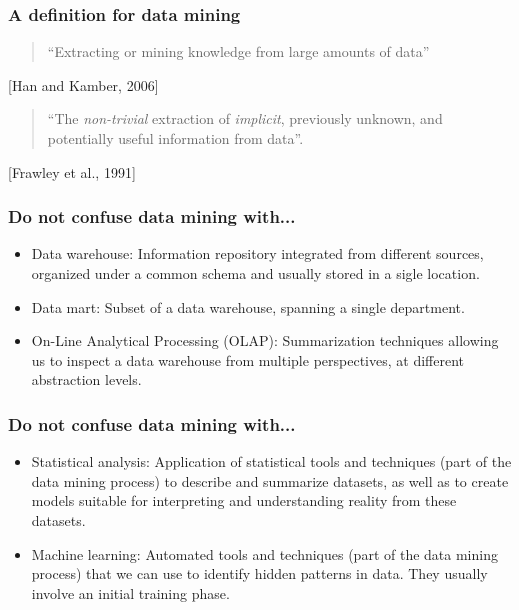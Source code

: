 \begin{frame}
\frametitle{A definition for data mining}

\begin{quote}
 ``Extracting or mining knowledge from large amounts of data''
\end{quote}
\begin{flushright}
{\small [Han and Kamber, 2006]}
\end{flushright}

\begin{quote}
 ``The \textit{non-trivial }extraction of \textit{implicit}, previously unknown, and potentially
useful information from data''.
\end{quote}
\begin{flushright}
{\small [Frawley et al., 1991]}
\end{flushright}


\end{frame}


\begin{frame}
\frametitle{Do not confuse data mining with...}

\begin{itemize}
 \item Data warehouse: Information repository integrated from different
sources, organized under a common schema and usually stored in a sigle location.

 \item Data mart: Subset of a data warehouse, spanning a single department.

 \item On-Line Analytical Processing (OLAP): Summarization techniques allowing us
to inspect a data warehouse from multiple perspectives, at different abstraction levels.

\end{itemize}

\end{frame}


\begin{frame}
\frametitle{Do not confuse data mining with...}

\begin{itemize}

 \item Statistical analysis: Application of statistical tools and techniques (part of the data
mining process) to describe and
summarize datasets, as well as to create models suitable for interpreting and understanding 
reality from these datasets.

 \item Machine learning: Automated tools and techniques (part of the data mining process) 
that we can use to identify hidden patterns in data. They usually involve an initial training phase.

\end{itemize}

\end{frame}

